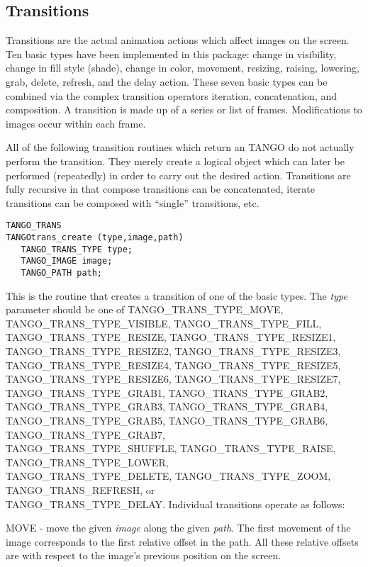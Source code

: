 \subsection{Transitions}
Transitions are the actual animation actions which affect images on
the screen.  Ten basic types have been implemented in this package:
change in visibility, change in fill style (shade), change in color,
movement, resizing, raising, lowering, grab, delete, refresh, and the
delay action.  These seven basic types can be combined via the complex
transition operators iteration, concatenation, and composition. A
transition is made up of a series or list of frames.  Modifications to
images occur within each frame.

All of the following transition routines which return an TANGO do not
actually perform the transition.  They merely create a logical object which
can later be performed (repeatedly) in order to carry out the desired
action.  Transitions are fully recursive in that compose transitions can be
concatenated, iterate transitions can be composed with ``single'' transitions,
etc.

\vspace{1em}
\begin{verbatim}
TANGO_TRANS
TANGOtrans_create (type,image,path) 
   TANGO_TRANS_TYPE type;
   TANGO_IMAGE image;
   TANGO_PATH path;
\end{verbatim}
This is the routine that creates a transition of one of the basic
types.  The {\em type} parameter should be one of
TANGO\_TRANS\_TYPE\_MOVE, TANGO\_TRANS\_TYPE\_VISIBLE,
TANGO\_TRANS\_TYPE\_FILL, TANGO\_TRANS\_TYPE\_RESIZE,
TANGO\_TRANS\_TYPE\_RESIZE1, TANGO\_TRANS\_TYPE\_RESIZE2,
TANGO\_TRANS\_TYPE\_RESIZE3, TANGO\_TRANS\_TYPE\_RESIZE4,
TANGO\_TRANS\_TYPE\_RESIZE5, TANGO\_TRANS\_TYPE\_RESIZE6,
TANGO\_TRANS\_TYPE\_RESIZE7, TANGO\_TRANS\_TYPE\_GRAB1,
TANGO\_TRANS\_TYPE\_GRAB2, TANGO\_TRANS\_TYPE\_GRAB3,
TANGO\_TRANS\_TYPE\_GRAB4,\\
TANGO\_TRANS\_TYPE\_GRAB5, TANGO\_TRANS\_TYPE\_GRAB6, 
TANGO\_TRANS\_TYPE\_GRAB7,\\
TANGO\_TRANS\_TYPE\_SHUFFLE, TANGO\_TRANS\_TYPE\_RAISE, 
TANGO\_TRANS\_TYPE\_LOWER,\\
TANGO\_TRANS\_TYPE\_DELETE, TANGO\_TRANS\_TYPE\_ZOOM, 
TANGO\_TRANS\_REFRESH, or\\
TANGO\_TRANS\_TYPE\_DELAY.  Individual
transitions  operate as follows:

MOVE - move the given {\em image} along the given {\em path}.  The first
movement of the image corresponds to the first relative offset in the path.
All these relative offsets are with respect to the image's previous position
on the screen.

